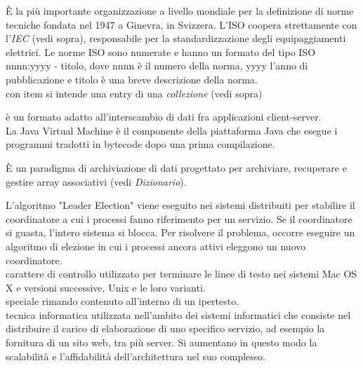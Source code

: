 \documentclass{scalatekids-article}
\begin{document}
   È la più importante organizzazione a livello mondiale per la definizione di norme tecniche fondata nel 1947 a Ginevra, in Svizzera.
  L'ISO coopera strettamente con l'\textit{IEC} (vedi sopra), responsabile per la standardizzazione degli equipaggiamenti elettrici.
  Le norme ISO sono numerate e hanno un formato del tipo ISO nnnn:yyyy - titolo, dove nnnn è il numero della norma, yyyy l'anno di pubblicazione e titolo è una breve descrizione della norma.
  \\

   con item si intende una entry di una \textit{collezione} (vedi sopra)
  \\


   è un formato adatto all'interscambio di dati fra applicazioni client-server.
  \\

   La Java Virtual Machine è il componente della piattaforma Java che esegue i programmi tradotti in bytecode dopo una prima compilazione.
  \\


   È un paradigma di archiviazione di dati progettato per archiviare, recuperare e gestire array associativi (vedi \textit{Dizionario}).
  \\

  
 L'algoritmo "Leader Election" viene eseguito nei sistemi distribuiti per stabilire il coordinatore a cui i processi fanno riferimento per un servizio.
Se il coordinatore si guasta, l'intero sistema si blocca. Per risolvere il problema, occorre eseguire un algoritmo di elezione in cui i processi ancora attivi eleggono un nuovo coordinatore.
\\

 carattere di controllo utilizzato per terminare le linee di testo nei sistemi Mac OS X e versioni successive, Unix e le loro varianti.
\\

   speciale rimando contenuto all'interno di un ipertesto.
  \\
  
   tecnica informatica utilizzata nell'ambito dei sistemi informatici che consiste nel distribuire il carico di elaborazione di uno specifico servizio, ad esempio la fornitura di un sito web, tra più server. Si aumentano in questo modo la scalabilità e l'affidabilità dell'architettura nel suo complesso.
  \\
\end{document}
